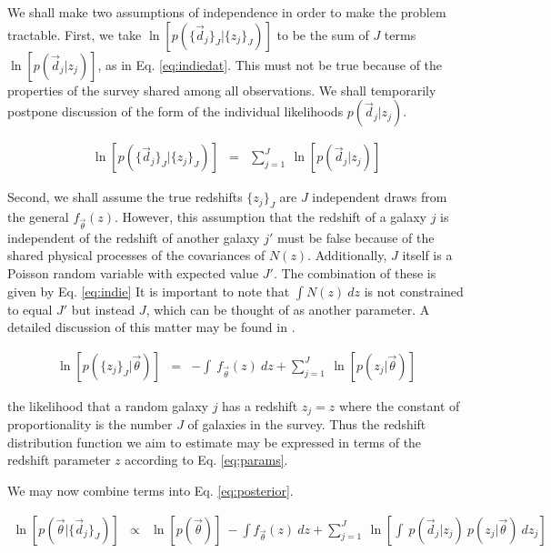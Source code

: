 \documentclass[preprint]{aastex}
\begin{document}
We shall make two assumptions of independence in order to make the problem 
tractable.  First, we take $\ln[p(\{\vec{d}_{j}\}_{J}|\{z_{j}\}_{J})]$ to be 
the sum of $J$ terms $\ln[p(\vec{d}_{j}|z_{j})]$, as in Eq. \ref{eq:indiedat}.  
This must not be true because of the properties of the survey shared among all 
observations.  We shall temporarily postpone discussion of the form of the 
individual likelihoods $p(\vec{d}_{j}|z_{j})$.  

\begin{eqnarray}
\label{eq:indiedat}
\ln[p(\{\vec{d}_{j}\}_{J}|\{z_{j}\}_{J})] &=& \sum_{j=1}^{J}\ 
\ln[p(\vec{d}_{j}|z_{j})]
\end{eqnarray}

Second, we shall assume the true redshifts $\{z_{j}\}_{J}$ are $J$ independent 
draws from the general $f_{\vec{\theta}}(z)$.  However, this assumption that 
the redshift of a galaxy $j$ is independent of the redshift of another galaxy 
$j'$ must be false because of the shared physical processes of the covariances 
of $N(z)$.  Additionally, $J$ itself is a Poisson random variable with expected 
value $J'$.  The combination of these is given by Eq. \ref{eq:indie}  It is 
important to note that $\int N(z)\ dz$ is not constrained to equal $J'$ but 
instead $J$, which can be thought of as another parameter.  A detailed 
discussion of this matter may be found in \citet{Foreman-Mackey2014}.

\begin{eqnarray}
\label{eq:indie}
\ln[p(\{z_{j}\}_{J}|\vec{\theta})] &=& -\int\ f_{\vec{\theta}}(z)\ dz +  
\sum_{j=1}^{J}\ \ln[p(z_{j}|\vec{\theta})]
\end{eqnarray}

the likelihood that a random galaxy $j$ has a redshift $z_{j}=z$ where the 
constant of proportionality is the number $J$ of galaxies in the survey.  Thus 
the redshift distribution function we aim to estimate may be expressed in terms 
of the redshift parameter $z$ according to Eq. \ref{eq:params}.  

We may now combine terms into Eq. \ref{eq:posterior}.

\begin{eqnarray}
\label{eq:posterior}
\ln[p(\vec{\theta}|\{\vec{d}_{j}\}_{J})] &\propto& \ln[p(\vec{\theta})]\ -\int 
f_{\vec{\theta}}(z)\ dz + \sum_{j=1}^{J}\ \ln\left[\int\ p(\vec{d}_{j}|z_{j})\ 
p(z_{j}|\vec{\theta})\ dz_{j}\right]
\end{eqnarray}
\end{document}
